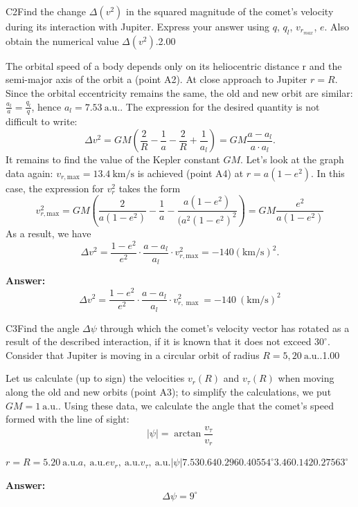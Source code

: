\documentclass[11pt,a4paper]{article}
\begin{document}
\begin{solcard}{C2}{Find the change $\Delta{(v^2)}$ in the squared magnitude of the comet's velocity during its interaction with Jupiter. Express your answer using $q$, $q_l$, $v_{r_{max}}$, $e$. Also obtain the numerical value $\Delta{(v^2)}$.}{2.00}

The orbital speed of a body depends only on its heliocentric distance r and the semi-major axis of the orbit a (point A2). At close approach to Jupiter $r=R$. Since the orbital eccentricity remains the same, the old and new orbit are similar: $\frac{a_l}{a}=\frac{q_l}{q}$, hence $a_l=7.53~\text{a.u.}$. The expression for the desired quantity is not difficult to write: \[ \Delta v^2=GM \left( \frac{2}{R}-\frac{1}{a}-\frac{2}{R}+\frac{1}{a_l} \right)=GM \frac{a-a_l}{a \cdot a_l}.\]It remains to find the value of the Kepler constant $GM$. Let's look at the graph data again: $v_{r,\text{max}} =13.4~\text{km}/\text{s}$ is achieved (point A4) at $r=a(1-e^2 )$. In this case, the expression for $v_r^2$ takes the form \[v_{r,\text{max}}^2=GM \left(\frac{2}{a(1-e^2)}-\frac{1}{a}-\frac{a(1-e^2)}{(a^2 (1-e^2 )^2} \right)=GM \frac{e^2}{a(1-e^2)}\] As a result, we have \[\Delta v^2=\frac{1-e^2}{e^2} \cdot \frac{a-a_l}{a_l} \cdot v_{r,\text{max}}^2=-140 \left( \text{km}/\text{s}\right)^2.\]

\par\smallskip\noindent\textbf{Answer:} $$ \Delta v^{2}=\frac{1-e^{2}}{e^{2}} \cdot \frac{a-a_{l}}{a_{l}} \cdot v_{r, \max }^{2}=-140~(\mathrm{km/s})^2 $$
\end{solcard}

\begin{solcard}{C3}{Find the angle $\Delta{ψ}$ through which the comet’s velocity vector has rotated as a result of the described interaction, if it is known that it does not exceed $30^{\circ}$. Consider that Jupiter is moving in a circular orbit of radius $R=5{,}20~\text{a.u.}$.}{1.00}

Let us calculate (up to sign) the velocities $v_r (R)$ and $v_\tau (R)$ when moving along the old and new orbits (point A3); to simplify the calculations, we put $GM = 1~\text{a.u.}$. Using these data, we calculate the angle that the comet’s speed formed with the line of sight: \[ |\psi|=\arctan \frac{v_\tau}{v_r}\]


$r=R=5.20~\text{a.u.}a,~\text{a.u.}ev_r,~\text{a.u.}v_\tau,~\text{a.u.}|\psi|7.530.640.2960.40554^\circ3.460.1420.27563^\circ$

\par\smallskip\noindent\textbf{Answer:} $$ \Delta \psi = 9^{\circ} $$
\end{solcard}
\end{document}

